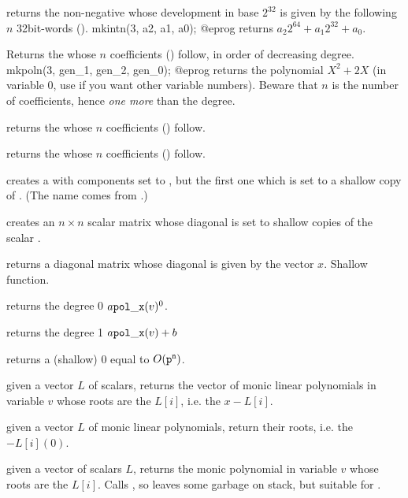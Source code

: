  returns the non-negative  whose
development in base $2^{32}$ is given by the following $n$ 32bit-words
().
\bprog
  mkintn(3, a2, a1, a0);
@eprog
\noindent returns $a_2 2^{64} + a_1 2^{32} + a_0$.

 Returns the  whose $n$
coefficients () follow, in order of decreasing degree.
\bprog
  mkpoln(3, gen_1, gen_2, gen_0);
@eprog
\noindent returns the polynomial $X^2 + 2X$ (in variable $0$, use
 if you want other variable numbers). Beware that $n$ is the
number of coefficients, hence \emph{one more} than the degree.

 returns the  whose $n$
coefficients () follow.

 returns the  whose $n$
coefficients () follow.

 creates a  with 
components set to , but the first one which is set to a shallow
copy of . (The name comes from .)

 creates an $n\times n$
scalar matrix whose diagonal is set to shallow copies of the scalar .

 returns a diagonal matrix whose diagonal
is given by the vector $x$. Shallow function.

 returns the degree 0
 $a {\tt pol\_x}(v)^0$.

 returns the degree 1
 $a{\tt pol\_x}(v) + b$

 returns a (shallow) $0$
 equal to $O({\tt p}^{\tt n})$.


 given a vector $L$ of scalars,
returns the vector of monic linear polynomials in variable $v$ whose roots
are the $L[i]$, i.e. the $x - L[i]$.

 given a vector $L$ of monic linear
polynomials, return their roots, i.e. the $- L[i](0)$.

 given a vector of scalars $L$,
returns the monic polynomial in variable $v$ whose roots are the $L[i]$.
Calls , so leaves some garbage on stack, but
suitable for .

